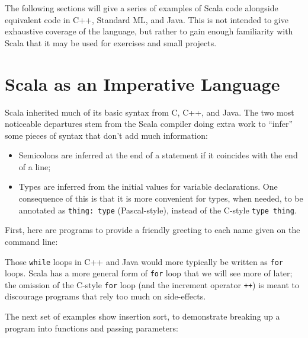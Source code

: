 \documentclass[11pt]{article}
\begin{document}
The following sections will give a series of examples of Scala code
alongside equivalent code in C++, Standard ML, and Java. This is
not intended to give exhaustive coverage of the language, but rather
to gain enough familiarity with Scala that it may be used for
exercises and small projects.

\section{Scala as an Imperative Language}
Scala inherited much of its basic syntax from C, C++, and Java. The
two most noticeable departures stem from the Scala compiler doing
extra work to ``infer'' some pieces of syntax that don't add much
information:
\begin{itemize}
\item Semicolons are inferred at the end of a statement if it
coincides with the end of a line;
\item Types are inferred from the initial values for variable
declarations. One consequence of this is that it is more convenient
for types, when needed, to be annotated as \verb|thing: type|
(Pascal-style), instead of the C-style \verb|type thing|.
\end{itemize}

First, here are programs to provide a friendly greeting to each
name given on the command line:

Those \texttt{while} loops in C++ and Java would more typically be
written as \texttt{for} loops. Scala has a more general form of
\texttt{for} loop that we will see more of later; the omission of
the C-style \texttt{for} loop (and the increment operator \verb|++|)
is meant to discourage programs that rely too much on side-effects.


The next set of examples show insertion sort, to demonstrate breaking
up a program into functions and passing parameters:

\end{document}
